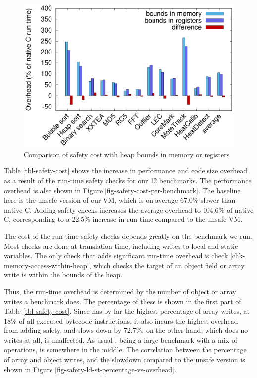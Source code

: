 \begin{figure}
\centering
\includegraphics[width=\mygraphsize]{safety-cost-diff-using-regs.eps}
\caption{Comparison of safety cost with heap bounds in memory or registers}
\label{fig-safety-cost-memory-or-registers}
\end{figure}

Table \ref{tbl-safety-cost} shows the increase in performance and code size overhead as a result of the run-time safety checks for our 12 benchmarks. The performance overhead is also shown in Figure \ref{fig-safety-cost-per-benchmark}. The baseline here is the unsafe version of our VM, which is on average 67.0\% slower than native C. Adding safety checks increases the average overhead to 104.6\% of native C, corresponding to a 22.5\% increase in run time compared to the unsafe VM.

The cost of the run-time safety checks depends greatly on the benchmark we run. Most checks are done at translation time, including writes to local and static variables. The only check that adds significant run-time overhead is check \ref{chk-memory-access-within-heap}, which checks the target of an object field or array write is within the bounds of the heap.

Thus, the run-time overhead is determined by the number of object or array writes a benchmark does. The percentage of these is shown in the first part of Table \ref{tbl-safety-cost}. Since  has by far the highest percentage of array writes, at 18\% of all executed bytecode instructions, it also incurs the highest overhead from adding safety, and slows down by 72.7\%.  on the other hand, which does no writes at all, is unaffected. As usual , being a large benchmark with a mix of operations, is somewhere in the middle. The correlation between the percentage of array and object writes, and the slowdown compared to the unsafe version is shown in Figure \ref{fig-safety-ld-st-percentage-vs-overhead}.

